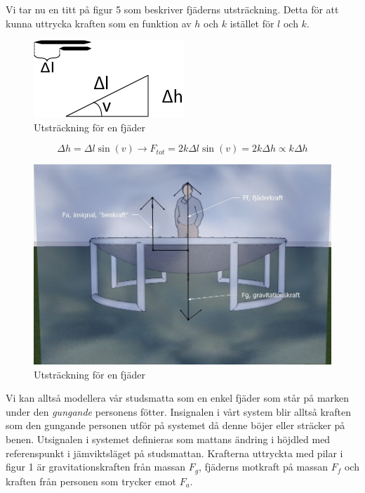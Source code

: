 \documentclass[10pt,a4paper]{article}
\begin{document}
\pagebreak
Vi tar nu en titt på figur 5 som beskriver fjäderns utsträckning. Detta för att kunna uttrycka kraften som en funktion av $h$ och $k$ istället för $l$ och $k$.

\begin{figure}[ht]
\begin{center}
\includegraphics[scale=0.5]{utstrackning}
\caption{Utsträckning för en fjäder}
\end{center}
\end{figure}

$$\Delta h = \Delta l \sin(v) \rightarrow F_{tot}=2k\Delta l \sin(v)=2k\Delta h\propto k\Delta h $$

\begin{figure}[ht]
\begin{center}
\includegraphics[scale=0.5]{BildKrafter}
\caption{Utsträckning för en fjäder}
\end{center}
\end{figure}

Vi kan alltså modellera vår studsmatta som en enkel fjäder som står på marken under den \emph{gungande} personens fötter.
Insignalen i vårt system blir alltså kraften som den gungande personen utför på systemet då denne böjer eller sträcker på benen. Utsignalen i systemet definieras som mattans ändring i höjdled med referenspunkt i jämviktsläget på studsmattan. 
Krafterna uttryckta med pilar i figur 1 är gravitationskraften från massan $F_g$, fjäderns motkraft på massan $F_f$ och kraften från personen som trycker emot $F_a$.
\end{document}
